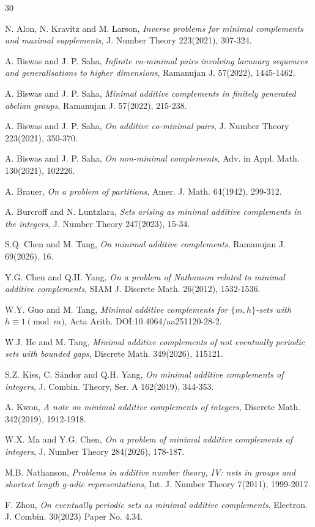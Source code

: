 \documentclass[12pt]{article}
\numberwithin{equation}{section}
\begin{document}
\begin{thebibliography}{30}

 N. Alon, N. Kravitz and M. Larson, {\it Inverse problems for minimal complements and maximal supplements}, J. Number Theory 223(2021), 307-324.

 A. Biswas and J. P. Saha, {\it Infinite co-minimal pairs involving lacunary sequences and generalisations to higher dimensions}, Ramanujan J. 57(2022), 1445-1462.

 A. Biswas and J. P. Saha, {\it Minimal additive complements in finitely generated abelian groups}, Ramanujan J. 57(2022), 215-238.

 A. Biswas and J. P. Saha, {\it On additive co-minimal pairs}, J. Number Theory 223(2021), 350-370.

 A. Biswas and J. P. Saha, {\it On non-minimal complements}, Adv. in Appl. Math. 130(2021), 102226.

  A. Brauer, {\it On a problem of partitions}, Amer. J. Math. 64(1942), 299-312.

  A. Burcroff and N. Luntzlara, {\it Sets arising as minimal additive complements in the integers}, J. Number Theory 247(2023), 15-34.

 S.Q. Chen and M. Tang, {\it On minimal additive complements}, Ramanujan J. 69(2026), 16.

 Y.G. Chen and Q.H. Yang, {\it On a problem of Nathanson related to minimal additive complements}, SIAM J. Discrete Math. 26(2012), 1532-1536.

 W.Y. Guo and M. Tang, {\it Minimal additive complements for $\{m,h\}$-sets with $h\equiv 1\pmod m$}, Acta Arith. DOI:10.4064/aa251120-28-2.

 W.J. He and M. Tang, {\it Minimal additive complements of not eventually periodic sets with bounded gaps}, Discrete Math. 349(2026), 115121.

 S.Z. Kiss, C. S\'{a}ndor and Q.H. Yang, {\it On minimal additive complements of integers}, J. Combin. Theory, Ser. A 162(2019), 344-353.

 A. Kwon, {\it A note on minimal additive complements of integers}, Discrete Math. 342(2019), 1912-1918.

 W.X. Ma and Y.G. Chen, {\it On a problem of minimal additive complements of integers}, J. Number Theory 284(2026), 178-187.

 M.B. Nathanson, {\it Problems in additive number theory, IV: nets in groups and shortest length g-adic representations}, Int. J. Number Theory 7(2011), 1999-2017.

 F. Zhou, {\it On eventually periodic sets as minimal additive complements}, Electron. J. Combin. 30(2023) Paper No. 4.34.
\end{thebibliography}
\end{document}
